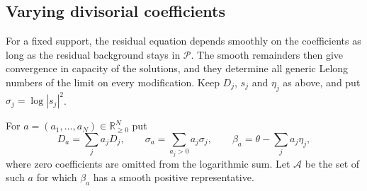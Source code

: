 \subsection{Varying divisorial coefficients}

For a fixed support, the residual equation depends smoothly on the coefficients as long as the residual background stays in $\mathscr P$. The smooth remainders then give convergence in capacity of the solutions, and they determine all generic Lelong numbers of the limit on every modification. Keep $D_j$, $s_j$ and $\eta_j$ as above, and put $\sigma_j=\log|s_j|^2$.

For $a=(a_1,\ldots,a_N)\in\mathbb R_{\geq0}^N$ put
\[
 D_a=\sum_j a_jD_j,\qquad
 \sigma_a=\sum_{a_j>0}a_j\sigma_j,\qquad
 \beta_a=\theta-\sum_j a_j\eta_j,
\]
where zero coefficients are omitted from the logarithmic sum. Let $\mathcal A$ be the set of such $a$ for which $\beta_a$ has a smooth positive representative.


